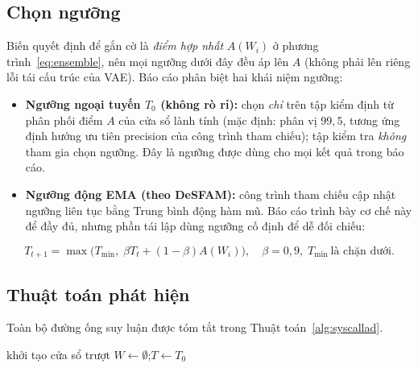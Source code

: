 \subsection{Chọn ngưỡng}
\label{subsec:threshold}
Biến quyết định để gắn cờ là \emph{điểm hợp nhất} $A(W_i)$ ở
phương trình~\eqref{eq:ensemble}, nên mọi ngưỡng dưới đây đều áp lên $A$ (không
phải lên riêng lỗi tái cấu trúc của VAE). Báo cáo phân biệt hai khái niệm ngưỡng:
\begin{itemize}[leftmargin=1.6em]
  \item \textbf{Ngưỡng ngoại tuyến $T_0$ (không rò rỉ):} chọn \emph{chỉ} trên tập
        kiểm định từ phân phối điểm $A$ của cửa sổ lành tính (mặc định:
        phân vị $99{,}5$, tương ứng định hướng ưu tiên precision của công trình tham
        chiếu); tập kiểm tra \emph{không} tham gia chọn ngưỡng. Đây là ngưỡng được
        dùng cho mọi kết quả trong báo cáo.
  \item \textbf{Ngưỡng động EMA (theo DeSFAM):} công trình tham chiếu cập nhật ngưỡng
        liên tục bằng Trung bình động hàm mũ. Báo cáo trình bày cơ chế này để đầy đủ,
        nhưng phần tái lập dùng ngưỡng cố định để dễ đối chiếu:
\end{itemize}
\begin{equation}
  T_{t+1} = \max\!\big(T_{\min},\; \beta T_t + (1-\beta) A(W_i)\big),
  \quad \beta=0{,}9,\; T_{\min}\ \text{là chặn dưới.}
  \label{eq:ema}
\end{equation}

\subsection{Thuật toán phát hiện}
Toàn bộ đường ống suy luận được tóm tắt trong Thuật toán~\ref{alg:syscallad}.

\begin{algorithm}[htbp]
\caption{Phát hiện bất thường syscall thời gian thực (SyscallAD)}
\label{alg:syscallad}
khởi tạo cửa sổ trượt $W \gets \emptyset$;\quad $T \gets T_0$\;
\end{algorithm}
